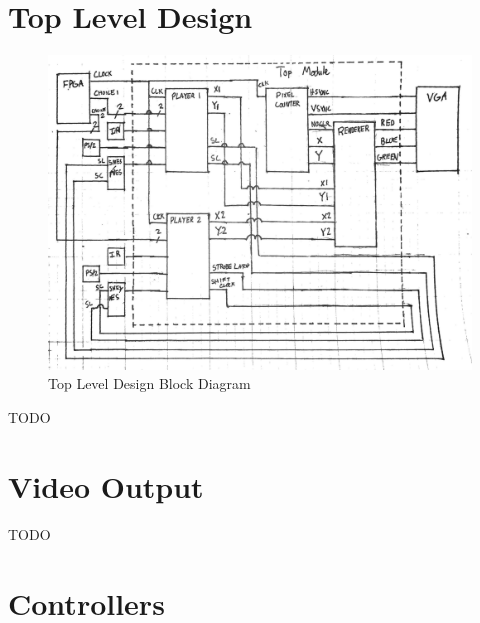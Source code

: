 \documentclass[]{article}
\begin{document}
\section{Top Level Design}
\begin{figure}[H]\centering
    \includegraphics[width=\linewidth]{figures/Top_Block.jpg}
    \caption{Top Level Design Block Diagram} 
    \label{fig:biPhaseExample}
\end{figure}
TODO

\section{Video Output}
TODO

\section{Controllers}
\end{document}
